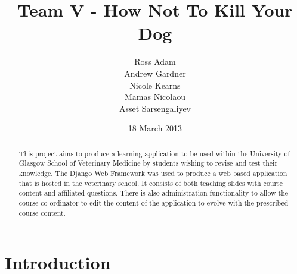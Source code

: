\documentclass{l3proj}
\begin{document}
\title{Team V - How Not To Kill Your Dog}
\author{Ross Adam \\
        Andrew Gardner \\
        Nicole Kearns \\
        Mamas Nicolaou \\
        Asset Sarsengaliyev}
\date{18 March 2013}
\maketitle
\begin{abstract}

This project aims to produce a learning application to be used within the University of Glasgow School of Veterinary Medicine by students wishing to revise and test their knowledge.  The Django Web Framework was used to produce a web based application that is hosted in the veterinary school. It consists of both teaching slides with course content and affiliated questions. There is also administration functionality to allow the course co-ordinator to edit the content of the application to evolve with the prescribed course content.

\end{abstract}
\educationalconsent
\tableofcontents

\chapter{Introduction}
\label{intro}
\end{document}
